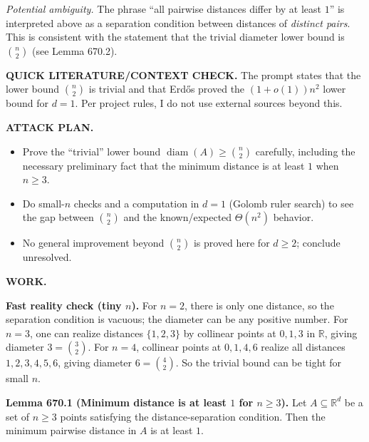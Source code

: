 \medskip
\noindent\emph{Potential ambiguity.}
The phrase ``all pairwise distances differ by at least $1$'' is interpreted above as a separation condition between distances of \emph{distinct pairs}. This is consistent with the statement that the trivial diameter lower bound is $\binom n2$ (see Lemma 670.2).

\bigskip
\noindent\textbf{QUICK LITERATURE/CONTEXT CHECK.}
The prompt states that the lower bound $\binom n2$ is trivial and that Erd\H{o}s proved the $(1+o(1))n^2$ lower bound for $d=1$.
Per project rules, I do not use external sources beyond this.

\bigskip
\noindent\textbf{ATTACK PLAN.}
\begin{itemize}
\item Prove the ``trivial'' lower bound $\operatorname{diam}(A)\ge \binom n2$ carefully, including the necessary preliminary fact that the minimum distance is at least $1$ when $n\ge 3$.
\item Do small-$n$ checks and a computation in $d=1$ (Golomb ruler search) to see the gap between $\binom n2$ and the known/expected $\Theta(n^2)$ behavior.
\item No general improvement beyond $\binom n2$ is proved here for $d\ge 2$; conclude unresolved.
\end{itemize}

\bigskip
\noindent\textbf{WORK.}

\medskip
\noindent\textbf{Fast reality check (tiny $n$).}
For $n=2$, there is only one distance, so the separation condition is vacuous; the diameter can be any positive number.
For $n=3$, one can realize distances $\{1,2,3\}$ by collinear points at $0,1,3$ in $\mathbb{R}$, giving diameter $3=\binom 32$.
For $n=4$, collinear points at $0,1,4,6$ realize all distances $1,2,3,4,5,6$, giving diameter $6=\binom 42$.
So the trivial bound can be tight for small $n$.

\medskip
\noindent\textbf{Lemma 670.1 (Minimum distance is at least $1$ for $n\ge 3$).}
Let $A\subseteq\mathbb{R}^d$ be a set of $n\ge 3$ points satisfying the distance-separation condition.
Then the minimum pairwise distance in $A$ is at least $1$.

